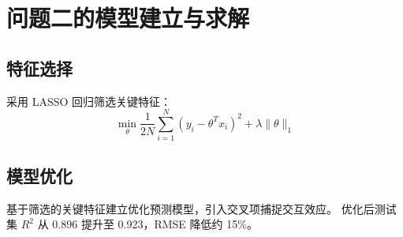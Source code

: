 \section{问题二的模型建立与求解}

\subsection{特征选择}

采用 LASSO 回归筛选关键特征：
\begin{equation}
\min_{\theta} \frac{1}{2N} \sum_{i=1}^{N} (y_i - \theta^T x_i)^2 + \lambda \|\theta\|_1
  \label{eq:6-problem2-1}
\end{equation}

\subsection{模型优化}

基于筛选的关键特征建立优化预测模型，引入交叉项捕捉交互效应。
优化后测试集 $R^2$ 从 0.896 提升至 0.923，RMSE 降低约 15\%。
